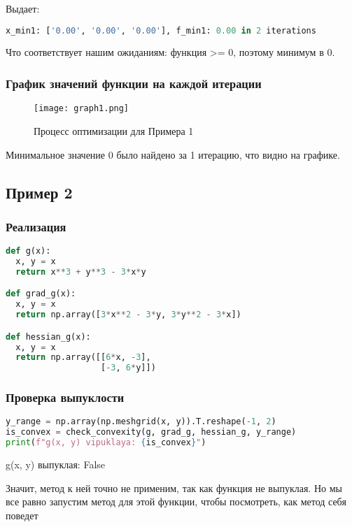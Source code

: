 \documentclass{article}
\begin{document}
Выдает:

\begin{lstlisting}[language=Python]
x_min1: ['0.00', '0.00', '0.00'], f_min1: 0.00 in 2 iterations
\end{lstlisting}

Что соответствует нашим ожиданиям: функция >=  0, поэтому минимум в 0.

\subsubsection{График значений функции на каждой итерации}

\begin{figure}[H]
    \centering
    \texttt{[image: graph1.png]}
    \caption{Процесс оптимизации для Примера 1}
\end{figure}

Минимальное значение 0 было найдено за 1 итерацию, что видно на графике.


\newpage
\subsection{Пример 2}

\subsubsection{Реализация}
\begin{lstlisting}[language=Python]
def g(x):
  x, y = x
  return x**3 + y**3 - 3*x*y

def grad_g(x):
  x, y = x
  return np.array([3*x**2 - 3*y, 3*y**2 - 3*x])

def hessian_g(x):
  x, y = x
  return np.array([[6*x, -3],
                   [-3, 6*y]])
\end{lstlisting}

\subsubsection{Проверка выпуклости}
\begin{lstlisting}[language=Python]
y_range = np.array(np.meshgrid(x, y)).T.reshape(-1, 2)
is_convex = check_convexity(g, grad_g, hessian_g, y_range)
print(f"g(x, y) vipuklaya: {is_convex}")
\end{lstlisting}

g(x, y) выпуклая: False

Значит, метод к ней точно не применим, так как функция не выпуклая. Но мы все равно запустим метод для этой функции, чтобы посмотреть, как метод себя поведет
\end{document}
